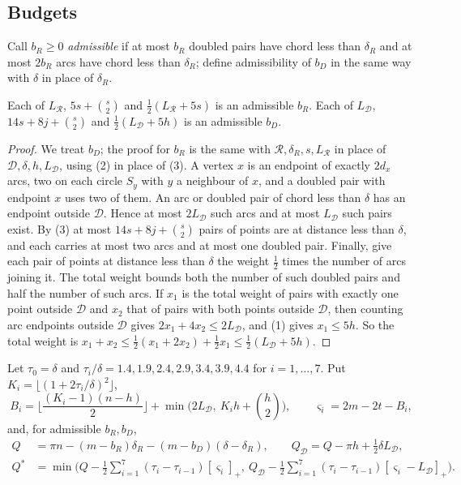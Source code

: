 \documentclass[11pt,colorlinks]{charlie}
\newcommand{\cR}{\mathcal{R}}
\newcommand{\cD}{\mathcal{D}}
\newcommand{\pos}[1]{\left[#1\right]_+}
\begin{document}
\subsection{Budgets}
Call $b_R\ge0$ \emph{admissible} if at most $b_R$ doubled pairs have chord less than $\delta_R$ and at most $2b_R$ arcs have chord less than $\delta_R$; define admissibility of $b_D$ in the same way with $\delta$ in place of $\delta_R$.

\begin{lemma}\label{lem:admissible}
Each of $L_\cR$, $5s+\binom s2$ and $\frac12(L_\cR+5s)$ is an admissible $b_R$. Each of $L_\cD$, $14s+8j+\binom s2$ and $\frac12(L_\cD+5h)$ is an admissible $b_D$.
\end{lemma}

\begin{proof}
We treat $b_D$; the proof for $b_R$ is the same with $\cR,\delta_R,s,L_\cR$ in place of $\cD,\delta,h,L_\cD$, using (2) in place of (3). A vertex $x$ is an endpoint of exactly $2d_x$ arcs, two on each circle $S_y$ with $y$ a neighbour of $x$, and a doubled pair with endpoint $x$ uses two of them. An arc or doubled pair of chord less than $\delta$ has an endpoint outside $\cD$. Hence at most $2L_\cD$ such arcs and at most $L_\cD$ such pairs exist. By (3) at most $14s+8j+\binom s2$ pairs of points are at distance less than $\delta$, and each carries at most two arcs and at most one doubled pair. Finally, give each pair of points at distance less than $\delta$ the weight $\frac12$ times the number of arcs joining it. The total weight bounds both the number of such doubled pairs and half the number of such arcs. If $x_1$ is the total weight of pairs with exactly one point outside $\cD$ and $x_2$ that of pairs with both points outside $\cD$, then counting arc endpoints outside $\cD$ gives $2x_1+4x_2\le2L_\cD$, and (1) gives $x_1\le5h$. So the total weight is $x_1+x_2\le\frac12(x_1+2x_2)+\frac12x_1\le\frac12(L_\cD+5h)$.
\end{proof}

Let $\tau_0=\delta$ and $\tau_i/\delta=1.4,1.9,2.4,2.9,3.4,3.9,4.4$ for $i=1,\dots,7$. Put $K_i=\lfloor(1+2\tau_i/\delta)^2\rfloor$,
\[
 B_i=\Big\lfloor\frac{(K_i-1)(n-h)}2\Big\rfloor+\min\Big(2L_\cD,\ K_ih+\binom h2\Big),\qquad \varsigma_i=2m-2t-B_i,
\]
and, for admissible $b_R,b_D$,
\begin{align*}
 Q&=\pi n-(m-b_R)\delta_R-(m-b_D)(\delta-\delta_R),\qquad Q_\cD=Q-\pi h+\tfrac12\delta L_\cD,\\
 Q^*&=\min\Big(Q-\tfrac12\sum_{i=1}^7(\tau_i-\tau_{i-1})\pos{\varsigma_i},\ Q_\cD-\tfrac12\sum_{i=1}^7(\tau_i-\tau_{i-1})\pos{\varsigma_i-L_\cD}\Big).
\end{align*}
\end{document}
